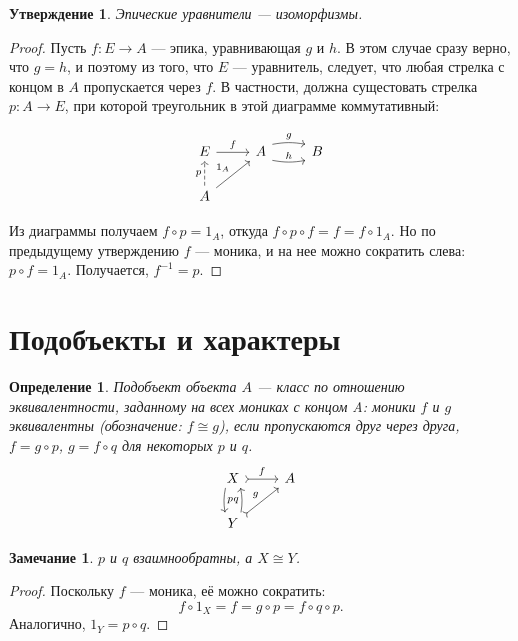 \documentclass[a4paper, 12pt]{article}
\newtheorem{definition}{Определение}
\newtheorem{exercise}{Утверждение}
\newtheorem{note}{Замечание}
\begin{document}
\begin{exercise}
Эпические уравнители --- изоморфизмы.
\end{exercise}
\begin{proof}
Пусть $f\colon E\to A$ --- эпика, уравнивающая $g$ и $h$. В этом случае сразу верно, что $g = h$, и поэтому из того, что $E$ --- уравнитель, следует, что любая стрелка с концом в $A$ пропускается через $f$. В частности, должна сущестовать стрелка $p\colon A\to E$, при которой треугольник в этой диаграмме коммутативный:

\[
\begin{tikzcd}
E \arrow{r}{f} 
& A \arrow[shift left=1ex, bend left=10]{r}{g} \arrow[shift right=1ex, bend right=10]{r}{h} & B \\
A \arrow[dashrightarrow]{u}{p} \arrow{ru}{1_A}
\end{tikzcd}
\]

Из диаграммы получаем $f\circ p = 1_A$, откуда 
$f\circ p \circ f = f = f\circ 1_A$. Но по предыдущему утверждению $f$ --- моника, и на нее можно сократить слева: $p\circ f = 1_A$. Получается, $f^{-1}=p$.  \end{proof}

\pagebreak
\section{Подобъекты и характеры}

\begin{definition}
Подобъект объекта $A$ --- класс по отношению эквивалентности,
заданному на всех мониках с концом A: моники $f$ и $g$ эквивалентны (обозначение: $f\cong g$), если пропускаются друг через друга, $f = g\circ p$, $g = f\circ q$ для некоторых $p$ и $q$. 
\[
\begin{tikzcd}
X \arrow[shift right=1ex, bend right=10]{d}{p} \arrow[tail]{r}{f}
& A \\
Y \arrow[tail]{ur}{g}  \arrow[shift right=1ex, bend right=10]{u}{q}
\end{tikzcd}
\]
\end{definition}

\begin{note} $p$ и $q$ взаимнообратны, а $X\cong Y$.
\end{note}
\begin{proof} Поскольку $f$ --- моника, её можно сократить:
$$f\circ 1_X = f = g\circ p = f\circ q\circ p.$$
Аналогично, $1_Y = p\circ q$.
\end{proof}
\end{document}
